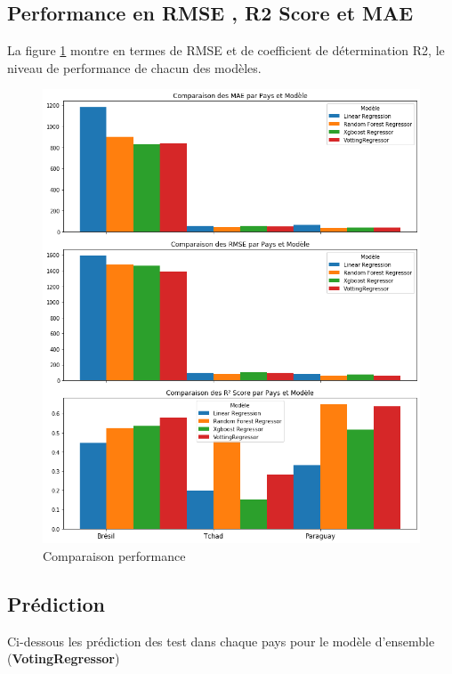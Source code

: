 \subsection{Performance en RMSE , R2 Score et MAE}
La figure \ref{fig:metriccomparaison} montre en termes de RMSE et de coefficient de détermination R2, le niveau de performance de chacun des modèles.
\begin{figure}[h!]
	\centering
	\includegraphics[width=0.8\linewidth]{images/metric_comparaison}
	\caption{Comparaison performance}
	\label{fig:metriccomparaison}
\end{figure}
\newpage
\subsection{Prédiction}
Ci-dessous les prédiction des test dans chaque pays pour le modèle d'ensemble (\textbf{VotingRegressor})
